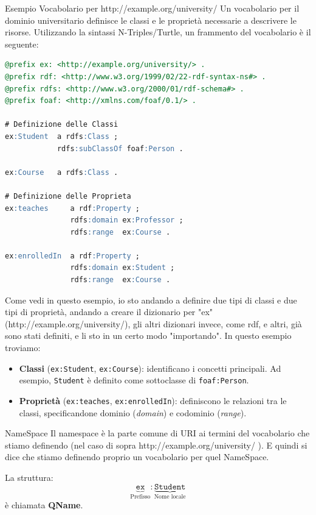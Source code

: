 \begin{example}{Esempio Vocabolario per http://example.org/university/}
    Un vocabolario per il dominio universitario definisce le classi e le proprietà necessarie a descrivere le risorse. Utilizzando la sintassi N-Triples/Turtle, un frammento del vocabolario è il seguente:
    
    \begin{lstlisting}[language=SQL, caption={Definizione del vocabolario universitario Turtle}]
@prefix ex: <http://example.org/university/> .
@prefix rdf: <http://www.w3.org/1999/02/22-rdf-syntax-ns#> .
@prefix rdfs: <http://www.w3.org/2000/01/rdf-schema#> .
@prefix foaf: <http://xmlns.com/foaf/0.1/> .

# Definizione delle Classi
ex:Student  a rdfs:Class ;
            rdfs:subClassOf foaf:Person .

ex:Course   a rdfs:Class .

# Definizione delle Proprieta
ex:teaches     a rdf:Property ;
               rdfs:domain ex:Professor ;
               rdfs:range  ex:Course .

ex:enrolledIn  a rdf:Property ;
               rdfs:domain ex:Student ;
               rdfs:range  ex:Course .
    \end{lstlisting}
    Come vedi in questo esempio, io sto andando a definire due tipi di classi e due tipi di proprietà, andando a creare il dizionario per "ex" (http://example.org/university/),
    gli altri dizionari invece, come rdf, e altri, già sono stati definiti, e li sto in un certo modo "importando".
    In questo esempio troviamo:
    \begin{itemize}
        \item \textbf{Classi} (\texttt{ex:Student}, \texttt{ex:Course}): identificano i concetti principali. Ad esempio, \texttt{Student} è definito come sottoclasse di \texttt{foaf:Person}.
        \item \textbf{Proprietà} (\texttt{ex:teaches}, \texttt{ex:enrolledIn}): definiscono le relazioni tra le classi, specificandone dominio (\textit{domain}) e codominio (\textit{range}).
    \end{itemize}
\end{example}

\begin{definition}{NameSpace}
    Il namespace è la parte comune di URI ai termini del vocabolario che stiamo definendo (nel caso di sopra http://example.org/university/ ).
    E quindi si dice che stiamo definendo proprio un vocabolario per quel NameSpace.
\end{definition}
La struttura:
\[
\underbrace{\texttt{ex}}_{\text{Prefisso}}
:
\underbrace{\texttt{Student}}_{\text{Nome locale}}
\]
è chiamata \textbf{QName}.

